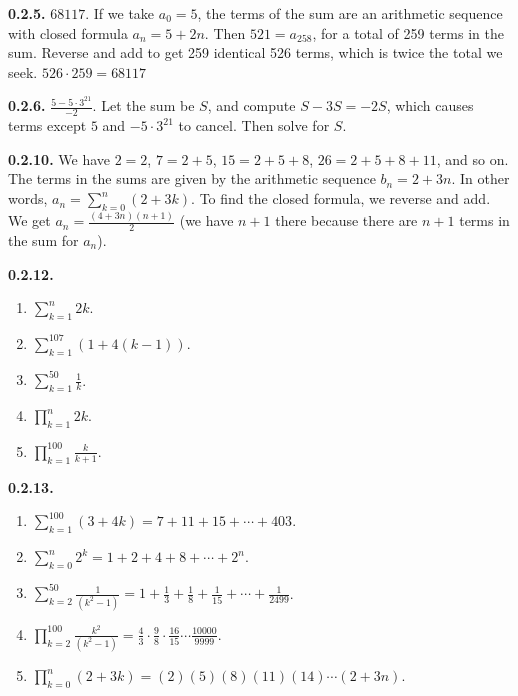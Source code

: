 \documentclass[12pt,]{book}
\theoremstyle{plain}
\theoremstyle{definition}
\theoremstyle{definition}
\theoremstyle{definition}
\numberwithin{equation}{chapter}
\renewcommand{\d}{\displaystyle}
\begin{document}
%
\par\smallskip
\noindent\textbf{0.2.5.} \hypertarget{p-200}{}%
\(68117\).  If we take \(a_0 = 5\), the terms of the sum are an arithmetic sequence with closed formula \(a_n = 5+2n\).  Then \(521 = a_{258}\), for a total of 259 terms in the sum.  Reverse and add to get 259 identical 526 terms, which is twice the total we seek.  \(526\cdot 259 = 68117\)%
\par\smallskip
\noindent\textbf{0.2.6.} \hypertarget{p-202}{}%
\(\frac{5-5\cdot 3^{21}}{-2}\).  Let the sum be \(S\), and compute \(S - 3S = -2S\), which causes terms except \(5\) and \(-5\cdot 3^{21}\) to cancel.  Then solve for \(S\).%
\par\smallskip
\noindent\textbf{0.2.10.} \hypertarget{p-212}{}%
We have \(2 = 2\), \(7 = 2+5\), \(15 = 2 + 5 + 8\), \(26 = 2+5+8+11\), and so on. The terms in the sums are given by the arithmetic sequence \(b_n = 2+3n\). In other words, \(a_n = \sum_{k=0}^n (2+3k)\). To find the closed formula, we reverse and add. We get \(a_n = \frac{(4+3n)(n+1)}{2}\) (we have \(n+1\) there because there are \(n+1\) terms in the sum for \(a_n\)).%
\par\smallskip
\noindent\textbf{0.2.12.} \hypertarget{p-221}{}%
\leavevmode%
\begin{enumerate}[label=(\alph*)]
\item\hypertarget{li-134}{}\(\d\sum_{k=1}^n 2k\).%
\item\hypertarget{li-135}{}\(\d\sum_{k=1}^{107} (1 + 4(k-1))\).%
\item\hypertarget{li-136}{}\(\d\sum_{k=1}^{50} \frac{1}{k}\).%
\item\hypertarget{li-137}{}\(\d\prod_{k=1}^n 2k\).%
\item\hypertarget{li-138}{}\(\d\prod_{k=1}^{100} \frac{k}{k+1}\).%
\end{enumerate}
%
\par\smallskip
\noindent\textbf{0.2.13.} \hypertarget{p-224}{}%
\leavevmode%
\begin{enumerate}[label=(\alph*)]
\item\hypertarget{li-144}{}\(\d\sum_{k=1}^{100} (3+4k) = 7 + 11 + 15 + \cdots + 403\).%
\item\hypertarget{li-145}{}\(\d\sum_{k=0}^n 2^k = 1 + 2 + 4 + 8 + \cdots + 2^n\).%
\item\hypertarget{li-146}{}\(\d\sum_{k=2}^{50}\frac{1}{(k^2 - 1)} = 1 + \frac{1}{3} + \frac{1}{8} + \frac{1}{15} + \cdots + \frac{1}{2499}\).%
\item\hypertarget{li-147}{}\(\d\prod_{k=2}^{100}\frac{k^2}{(k^2-1)} = \frac{4}{3}\cdot\frac{9}{8}\cdot\frac{16}{15}\cdots\frac{10000}{9999}\).%
\item\hypertarget{li-148}{}\(\d\prod_{k=0}^n (2+3k) = (2)(5)(8)(11)(14)\cdots(2+3n)\).%
\end{enumerate}
%
\par\smallskip
\end{document}

